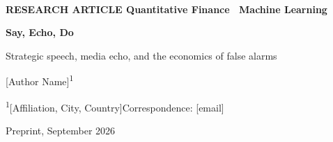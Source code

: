 \documentclass[11pt,a4paper]{article}
\theoremstyle{sci}
\theoremstyle{scidef}
\begin{document}
\thispagestyle{empty}
\noindent{\color{sNavy}\rule{\linewidth}{1.2pt}}\\[4pt]
{\sffamily\footnotesize\bfseries\color{sNavy} RESEARCH ARTICLE \quad\textcolor{sGray}{\textbar}\quad \textcolor{sGray}{Quantitative Finance \textbullet\ Machine Learning}}\par
\vspace{10pt}
{\sffamily\bfseries\fontsize{24}{29}\selectfont \textcolor{say}{Say}, \textcolor{echo}{Echo}, \textcolor{do}{Do}\par}
\vspace{6pt}
{\sffamily\fontsize{15}{19}\selectfont Strategic speech, media echo, and the economics of false alarms\par}
\vspace{12pt}
{\sffamily\large [Author Name]\textsuperscript{1}\par}
\vspace{2pt}
{\sffamily\small\color{ink!75}\textsuperscript{1}[Affiliation, City, Country]\quad\textbullet\quad Correspondence: [email]\par}
\vspace{4pt}
{\sffamily\footnotesize\color{sGray} Preprint, September 2026\par}
\vspace{10pt}
\end{document}
